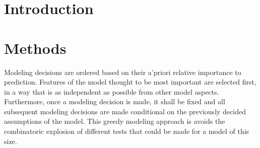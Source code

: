 \documentclass[12pt]{article}
\begin{document}
%
\clearpage
\onehalfspacing
%

%
%
\section{Introduction}\label{introduction}
%
%


%
%
\section{Methods}\label{methods}
%
%


Modeling decisions are ordered based on their a'priori relative importance to 
prediction. Features of the model thought to be most important are 
selected first, in a way that is as independent as possible from other model 
aspects. Furthermore, once a modeling decision is made, it shall be fixed and 
all subsequent modeling decisions are made conditional on the previously 
decided assumptions of the model. This greedy modeling approach is avoids the 
combinatoric explosion of different tests that could be made for a model of 
this size.

\end{document}
